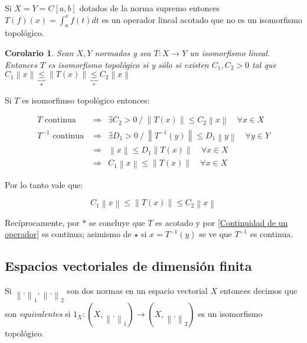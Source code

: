 \documentclass[11pt]{article}
\newcommand{\norm}[1]{\left\lVert#1\right\rVert}
\numberwithin{theorem}{subsection}
\newtheorem{corollary}[theorem]{Corolario}
\newenvironment{proof}[1][Demostraci\'on]{\begin{trivlist}
		\item[\hskip \labelsep {\bfseries #1}]}{\end{trivlist}}
\newenvironment{definition}[1][Definici\'on]{\begin{trivlist}
		\item[\hskip \labelsep {\bfseries #1}]}{\end{trivlist}}
\newenvironment{example}[1][Ejemplo]{\begin{trivlist}
		\item[\hskip \labelsep {\bfseries #1 }]}{\end{trivlist}}
\begin{document}
\begin{example}
	Si $X = Y = C[a,b]$ dotados de la norma supremo entonces $T(f)(x) = \int_{a}^{x}{f(t)dt}$ es un operador lineal acotado que no es un isomorfismo topol\'ogico.
\end{example}

\begin{corollary}
	Sean $X,Y$ normados y sea $T:X \rightarrow Y$ un isomorfismo lineal. Entonces $T$ es isomorfismo topol\'ogico si y s\'olo si existen $C_1,C_2 > 0$ tal que $C_1 \norm{x} \underbrace{\leq}_{\star} \norm{T(x)} \underbrace{\leq}_{\ast} C_2\norm{x}$
\end{corollary}

\begin{proof}
	Si $T$ es isomorfimso topol\'ogico entonces:
	
	\begin{equation*}
	\begin{array}{ccc}
	T \text{ continua } & \Longrightarrow & \exists C_2 > 0 \ / \ \norm{T(x)} \leq C_2 \norm{x} \quad \forall x \in X \\
	T^{-1} \text{ continua } & \Longrightarrow & \exists D_1 > 0 \ / \ \norm{T^{-1}(y)} \leq D_1 \norm{y} \quad \forall y \in Y \\
	 & \Longrightarrow & \norm{x} \leq D_1 \norm{T(x)} \quad \forall x \in X \\
	 & \Longrightarrow & C_1\norm{x} \leq \norm{T(x)} \quad \forall x \in X 
	\end{array}
	\end{equation*}
	
	Por lo tanto vale que:
	
	\[
		C_1 \norm{x} \leq \norm{T(x)} \leq C_2\norm{x}
	\]
	
	Rec\'iprocamente, por $\ast$ se concluye que $T$ es acotado y por \ref{Continuidad de un operador} es continua; asimismo de $\star$ si $x = T^{-1}(y)$ se ve que $T^{-1}$ es continua.
	
\end{proof}

\subsection{Espacios vectoriales de dimensi\'on finita}

\begin{definition}
	Si $\norm{.}_1, \norm{.}_2$ son dos normas en un espacio vectorial $X$ entonces decimos que son \textit{equivalentes} si $1_X : (X,\norm{.}_1) \rightarrow (X,\norm{.}_2)$ es un isomorfismo topol\'ogico.
\end{definition}
\end{document}
